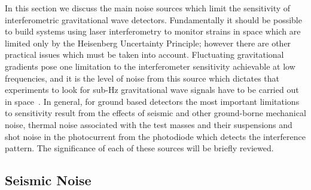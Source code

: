 \documentclass{article}
\begin{document}
In this section we discuss the main noise sources which limit the
sensitivity of interferometric gravitational wave
detectors. Fundamentally it should be possible to build systems using
laser interferometry to monitor strains in space which are limited
only by the Heisenberg Uncertainty Principle; however there are other
practical issues which must be taken into account. Fluctuating
gravitational gradients pose one limitation to the interferometer
sensitivity achievable at low frequencies, and it is the level of
noise from this source which dictates that experiments to look for
sub-Hz gravitational wave signals have to be carried out in
space~\cite{Spero, Saulson1, Beccaria, Hughes}. In general, for ground
based detectors the most important limitations to sensitivity result
from the effects of seismic and other ground-borne mechanical noise,
thermal noise associated with the test masses and their suspensions
and shot noise in the photocurrent from the photodiode which detects
the interference pattern. The significance of each of these sources
will be briefly reviewed. 




\subsection{Seismic Noise}
\label{subsection:seismic}
\end{document}
